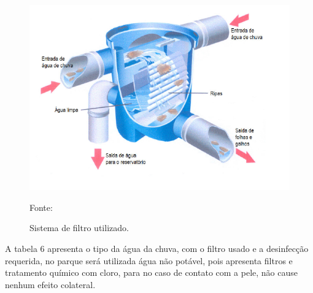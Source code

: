 \begin{figure}[H]
	 \centering
	\label{Sistema de filtro utilizado}
	 \includegraphics[scale=0.6]{captacao/10.png}
	 \caption{Sistema de filtro utilizado.}
	  \small{Fonte: \cite{ECOCASA}}
\end{figure}

A tabela 6 apresenta o tipo da água da chuva, com o filtro usado e a desinfecção requerida, no parque será utilizada água não potável, pois apresenta filtros e tratamento químico com cloro, para no caso de contato com a pele, não cause nenhum efeito colateral.

